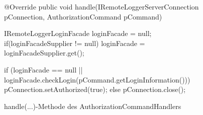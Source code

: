 \begin{figure}[h] 
    \centering
	\begin{spacing}{0.75}
		\begin{javacode}[firstnumber=28]
@Override
public void handle(IRemoteLoggerServerConnection pConnection, AuthorizationCommand pCommand)
{
  IRemoteLoggerLoginFacade loginFacade = null;
  if(loginFacadeSupplier != null)
    loginFacade = loginFacadeSupplier.get();
    
  if (loginFacade == null || loginFacade.checkLogin(pCommand.getLoginInformation()))
    pConnection.setAuthorized(true);
  else
    pConnection.close();
}\end{javacode}
	\end{spacing}
	\caption{\glqq handle(...)\grqq-Methode des \glqq AuthorizationCommandHandlers\grqq}
\end{figure}